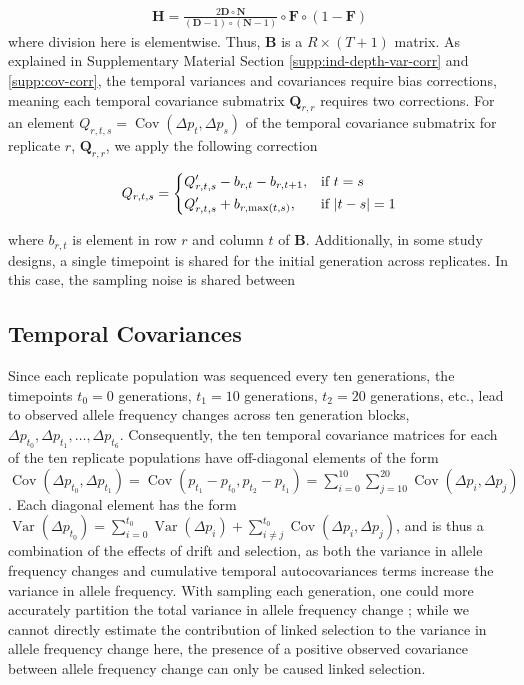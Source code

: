 \documentclass[11pt]{article}
\DeclareMathOperator{\var}{Var}
\DeclareMathOperator{\cov}{Cov}
\begin{document}
\begin{align}
  \mathbf{H} = \frac{2 \mathbf{D} \circ \mathbf{N} }{ (\mathbf{D}-1) \circ (\mathbf{N} -1)} \circ \mathbf{F} \circ (1-\mathbf{F})
\end{align}
%
where division here is elementwise. Thus, $\mathbf{B}$ is a $R \times (T+1)$
matrix. As explained in Supplementary Material Section
\ref{supp:ind-depth-var-corr} and \ref{supp:cov-corr}, the temporal variances
and covariances require bias corrections, meaning each temporal covariance
submatrix $\mathbf{Q}_{r,r}$ requires two corrections. For an element
$Q_{r,t,s} = \cov(\Delta p_t, \Delta p_s)$ of the temporal covariance submatrix
for replicate $r$, $\mathbf{Q}_{r,r}$, we apply the following correction

\begin{equation}
	Q_{r,t,s} =  
		\begin{dcases}
			Q_{r,t,s}' - b_{r,t} - b_{r,t+1}, & \text{if  } t = s \\
      Q_{r,t,s}' + b_{r,\max(t,s)}, & \text{if  } |t - s| = 1 \\
		\end{dcases}
\end{equation}

where $b_{r,t}$ is element in row $r$ and column $t$ of $\mathbf{B}$.
Additionally, in some study designs, a single timepoint is shared for the
initial generation across replicates. In this case, the sampling noise is
shared between 


\subsection{\textcite{Barghi2019-qy} Temporal Covariances}
\label{supp:barghi-covs}

Since each replicate population was sequenced every ten generations,
the timepoints $t_0 = 0$ generations, $t_1 = 10$ generations, $t_2 = 20$
generations, etc., lead to observed allele frequency changes across ten
generation blocks, $\Delta p_{t_0}, \Delta p_{t_1}, \ldots, \Delta p_{t_6}$.
Consequently, the ten temporal covariance matrices for each of the ten
replicate populations have off-diagonal elements of the form $\cov(\Delta
p_{t_0}, \Delta p_{t_1}) = \cov(p_{t_1} - p_{t_0}, p_{t_2} - p_{t_1}) =
\sum_{i=0}^{10} \sum_{j=10}^{20} \cov(\Delta p_i, \Delta p_j)$. Each diagonal
element has the form $\var(\Delta p_{t_0}) = \sum_{i=0}^{t_0} \var(\Delta
p_{i}) + \sum_{i \ne j}^{t_0} \cov(\Delta p_{i}, \Delta p_{j})$, and is thus a
combination of the effects of drift and selection, as both the variance in
allele frequency changes and cumulative temporal autocovariances terms increase
the variance in allele frequency. With sampling each generation, one could more
accurately partition the total variance in allele frequency change
\parencite{Buffalo2019-io}; while we cannot directly estimate the contribution
of linked selection to the variance in allele frequency change here, the
presence of a positive observed covariance between allele frequency change can
only be caused linked selection. 
\end{document}
